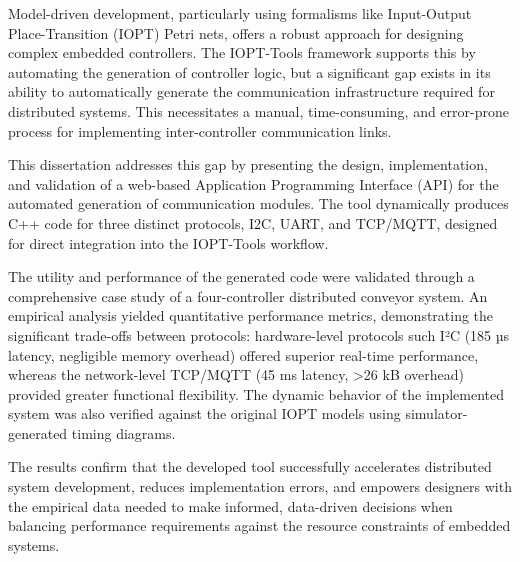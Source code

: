 
%

Model-driven development, particularly using formalisms like Input-Output Place-Transition (IOPT) Petri nets, offers a robust approach for designing complex embedded controllers. The IOPT-Tools framework supports this by automating the generation of controller logic, but a significant gap exists in its ability to automatically generate the communication infrastructure required for distributed systems. This necessitates a manual, time-consuming, and error-prone process for implementing inter-controller communication links.

This dissertation addresses this gap by presenting the design, implementation, and validation of a web-based Application Programming Interface (API) for the automated generation of communication modules. The tool dynamically produces C++ code for three distinct protocols, I2C, UART, and TCP/MQTT, designed for direct integration into the IOPT-Tools workflow.

The utility and performance of the generated code were validated through a comprehensive case study of a four-controller distributed conveyor system. An empirical analysis yielded quantitative performance metrics, demonstrating the significant trade-offs between protocols: hardware-level protocols such I²C (185 µs latency, negligible memory overhead) offered superior real-time performance, whereas the network-level TCP/MQTT (45 ms latency, >26 kB overhead) provided greater functional flexibility. The dynamic behavior of the implemented system was also verified against the original IOPT models using simulator-generated timing diagrams.

The results confirm that the developed tool successfully accelerates distributed system development, reduces implementation errors, and empowers designers with the empirical data needed to make informed, data-driven decisions when balancing performance requirements against the resource constraints of embedded systems.

